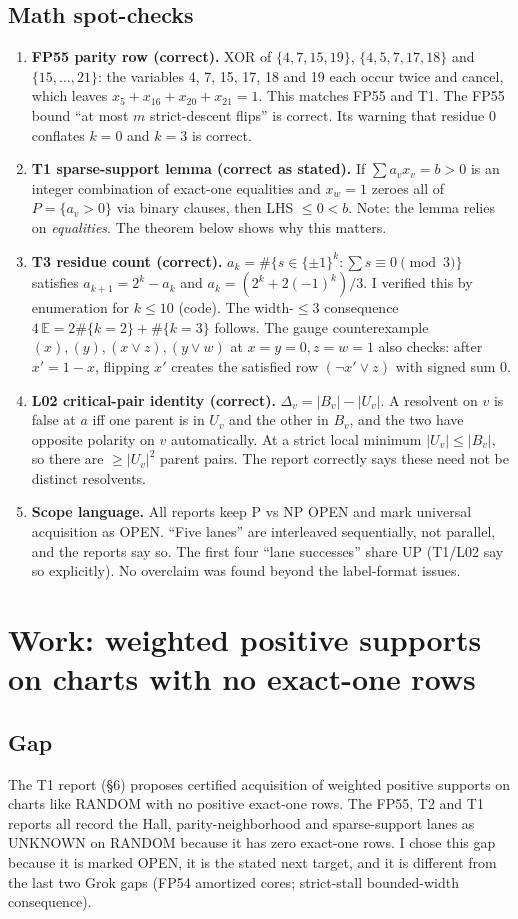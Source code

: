 \documentclass[11pt]{article}
\theoremstyle{definition}
\begin{document}
\subsection{Math spot-checks}
\begin{enumerate}
\item \textbf{FP55 parity row (correct).} XOR of $\{4,7,15,19\}$, $\{4,5,7,17,18\}$ and
$\{15,\dots,21\}$: the variables 4, 7, 15, 17, 18 and 19 each occur twice and cancel,
which leaves $x_5+x_{16}+x_{20}+x_{21}=1$. This matches FP55 and T1. The FP55 bound ``at most $m$ strict-descent flips'' is
correct. Its warning that residue $0$ conflates $k=0$ and $k=3$ is correct.
\item \textbf{T1 sparse-support lemma (correct as stated).} If $\sum a_vx_v=b>0$ is an
integer combination of exact-one equalities and $x_w=1$ zeroes all of $P=\{a_v>0\}$ via
binary clauses, then LHS $\le0<b$. Note: the lemma relies on \emph{equalities}. The
theorem below shows why this matters.
\item \textbf{T3 residue count (correct).} $a_k=\#\{s\in\{\pm1\}^k:\sum s\equiv0\pmod 3\}$
satisfies $a_{k+1}=2^k-a_k$ and $a_k=(2^k+2(-1)^k)/3$. I verified this by enumeration
for $k\le10$ (code). The width-$\le3$ consequence $4\,\mathbb{E}=2\#\{k{=}2\}+\#\{k{=}3\}$
follows. The gauge counterexample $(x),(y),(x\vee z),(y\vee w)$ at $x=y=0,z=w=1$ also
checks: after $x'=1-x$, flipping $x'$ creates the satisfied row $(\neg x'\vee z)$ with
signed sum $0$.
\item \textbf{L02 critical-pair identity (correct).} $\Delta_v=|B_v|-|U_v|$. A resolvent on
$v$ is false at $a$ iff one parent is in $U_v$ and the other in $B_v$, and the two have
opposite polarity on $v$ automatically. At a strict local minimum $|U_v|\le|B_v|$, so
there are $\ge|U_v|^2$ parent pairs. The report correctly says these need not be distinct
resolvents.
\item \textbf{Scope language.} All reports keep P vs NP OPEN and mark universal acquisition
as OPEN. ``Five lanes'' are interleaved sequentially, not parallel, and the reports say so.
The first four ``lane successes'' share UP (T1/L02 say so explicitly). No overclaim was
found beyond the label-format issues.
\end{enumerate}

\section{Work: weighted positive supports on charts with no exact-one rows}
\subsection{Gap}
The T1 report (\S6) proposes certified acquisition of weighted positive supports on charts
like RANDOM with no positive exact-one rows. The FP55, T2 and T1 reports all record the
Hall, parity-neighborhood and sparse-support lanes as UNKNOWN on RANDOM because it has
zero exact-one rows. I chose this gap because it is marked OPEN, it is the stated next
target, and it is different from the last two Grok gaps (FP54 amortized cores;
strict-stall bounded-width consequence).
\end{document}
